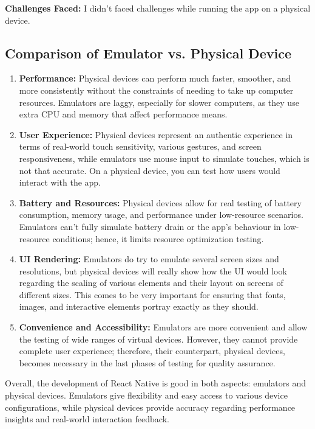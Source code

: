 \documentclass[a4paper,12pt]{article}
\begin{document}
\textbf{Challenges Faced:}
I didn't faced challenges while running the app on a physical device.

\subsection{Comparison of Emulator vs. Physical Device}
\begin{enumerate}
    \item \textbf{Performance:} Physical devices can perform much faster, smoother, and more consistently without the constraints of needing to take up computer resources. Emulators are laggy, especially for slower computers, as they use extra CPU and memory that affect performance means.
    \item \textbf{User Experience:} Physical devices represent an authentic experience in terms of real-world touch sensitivity, various gestures, and screen responsiveness, while emulators use mouse input to simulate touches, which is not that accurate. On a physical device, you can test how users would interact with the app.
    \item \textbf{Battery and Resources:} Physical devices allow for real testing of battery consumption, memory usage, and performance under low-resource scenarios. Emulators can't fully simulate battery drain or the app's behaviour in low-resource conditions; hence, it limits resource optimization testing.
    \item \textbf{UI Rendering:} Emulators do try to emulate several screen sizes and resolutions, but physical devices will really show how the UI would look regarding the scaling of various elements and their layout on screens of different sizes. This comes to be very important for ensuring that fonts, images, and interactive elements portray exactly as they should.
    \item \textbf{Convenience and Accessibility: } Emulators are more convenient and allow the testing of wide ranges of virtual devices. However, they cannot provide complete user experience; therefore, their counterpart, physical devices, becomes necessary in the last phases of testing for quality assurance.
\end{enumerate}

Overall, the development of React Native is good in both aspects: emulators and physical devices. Emulators give flexibility and easy access to various device configurations, while physical devices provide accuracy regarding performance insights and real-world interaction feedback.
\end{document}

